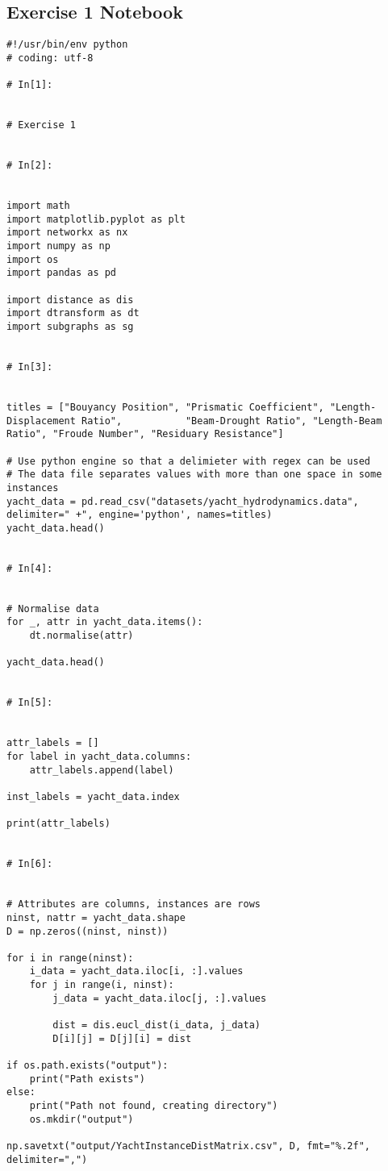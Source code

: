\documentclass[11pt, a4paper]{article}
\begin{document}
\subsection{Exercise 1 Notebook}
\begin{verbatim}
#!/usr/bin/env python
# coding: utf-8

# In[1]:


# Exercise 1


# In[2]:


import math
import matplotlib.pyplot as plt
import networkx as nx
import numpy as np
import os
import pandas as pd

import distance as dis
import dtransform as dt
import subgraphs as sg


# In[3]:


titles = ["Bouyancy Position", "Prismatic Coefficient", "Length-Displacement Ratio",           "Beam-Drought Ratio", "Length-Beam Ratio", "Froude Number", "Residuary Resistance"]

# Use python engine so that a delimieter with regex can be used
# The data file separates values with more than one space in some instances
yacht_data = pd.read_csv("datasets/yacht_hydrodynamics.data", delimiter=" +", engine='python', names=titles)
yacht_data.head()


# In[4]:


# Normalise data
for _, attr in yacht_data.items():
    dt.normalise(attr)
    
yacht_data.head()


# In[5]:


attr_labels = []
for label in yacht_data.columns:
    attr_labels.append(label)

inst_labels = yacht_data.index
    
print(attr_labels)


# In[6]:


# Attributes are columns, instances are rows
ninst, nattr = yacht_data.shape
D = np.zeros((ninst, ninst))

for i in range(ninst):
    i_data = yacht_data.iloc[i, :].values
    for j in range(i, ninst):
        j_data = yacht_data.iloc[j, :].values
        
        dist = dis.eucl_dist(i_data, j_data)
        D[i][j] = D[j][i] = dist
        
if os.path.exists("output"):
    print("Path exists")
else:
    print("Path not found, creating directory")
    os.mkdir("output")
    
np.savetxt("output/YachtInstanceDistMatrix.csv", D, fmt="%.2f", delimiter=",")    



\end{verbatim}
\end{document}
